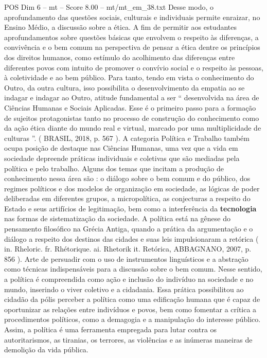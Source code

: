 \begin{textsample}{POS Dim 6 – mt – Score 8.00 – mt/mt\_em\_38.txt}
Desse modo, o aprofundamento das questões sociais, culturais e individuais permite enraizar, no Ensino Médio, a discussão sobre a ética.
A fim de permitir aos estudantes aprofundamentos sobre questões básicas que envolvem o respeito às diferenças, a convivência e o bem comum na perspectiva de pensar a ética dentre os princípios dos direitos humanos, como estímulo do acolhimento das diferenças entre diferentes povos com intuito de promover o convívio social e o respeito às pessoas, à coletividade e ao bem público.
Para tanto, tendo em vista o conhecimento do Outro, da outra cultura, isso possibilita o desenvolvimento da empatia ao se indagar e indagar ao Outro, atitude fundamental a ser “ desenvolvida na área de Ciências Humanas e Sociais Aplicadas.
Esse é o primeiro passo para a formação de sujeitos protagonistas tanto no processo de construção do conhecimento como da ação ética diante do mundo real e virtual, marcado por uma multiplicidade de culturas ”. ( BRASIL, 2018, p. 567 ).
A categoria Política e Trabalho também ocupa posição de destaque nas Ciências Humanas, uma vez que a vida em sociedade depreende práticas individuais e coletivas que são mediadas pela política e pelo trabalho.
Alguns dos temas que incitam a produção de conhecimento nessa área são : o diálogo sobre o bem comum e do público, dos regimes políticos e dos modelos de organização em sociedade, as lógicas de poder deliberadas em diferentes grupos, a micropolítica, as conjecturas a respeito do Estado e seus artifícios de legitimação, bem como a interferência da \textbf{tecnologia} nas formas de sistematização da sociedade.
A política está na gênese do pensamento filosófico na Grécia Antiga, quando a prática da argumentação e o diálogo a respeito dos destinos das cidades e suas leis impulsionaram a retórica ( in.
Rheloric. fr.
Rhétorique. ai.
Rhetorik it.
Retórica, ABBAGNANO, 2007, p. 856 ).
Arte de persuadir com o uso de instrumentos linguísticos e a abstração como técnicas indispensáveis para a discussão sobre o bem comum.
Nesse sentido, a política é compreendida como ação e inclusão do indivíduo na sociedade e no mundo, inserindo o viver coletivo e a cidadania.
Essa prática possibilitou ao cidadão da pólis perceber a política como uma edificação humana que é capaz de oportunizar as relações entre indivíduos e povos, bem como fomentar a crítica a procedimentos políticos, como a demagogia e a manipulação do interesse público.
Assim, a política é uma ferramenta empregada para lutar contra os autoritarismos, as tiranias, os terrores, as violências e as inúmeras maneiras de demolição da vida pública.

\end{textsample}
